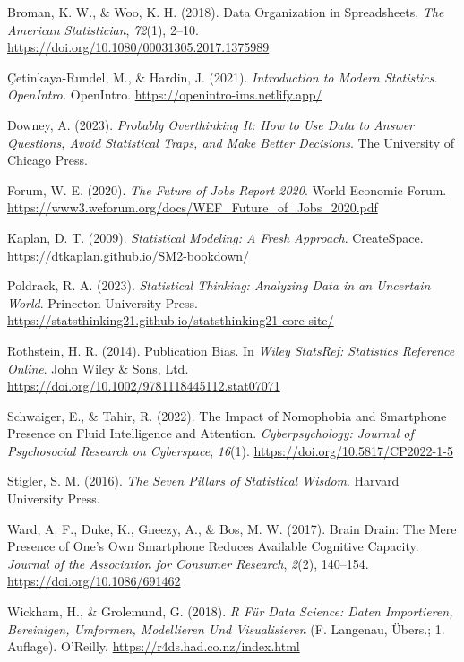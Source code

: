 \documentclass[
  a4paper,
  DIV=11]{scrreprt}
\newlength{\cslhangindent}
\newenvironment{CSLReferences}[2] %
 {\begin{list}{}{%
  \setlength{\itemindent}{0pt}
  \setlength{\leftmargin}{0pt}
  \setlength{\parsep}{0pt}
  \ifodd #1
   \setlength{\leftmargin}{\cslhangindent}
   \setlength{\itemindent}{-1\cslhangindent}
  \fi
  \setlength{\itemsep}{#2\baselineskip}}}
 {\end{list}}
\theoremstyle{definition}
\theoremstyle{definition}
\theoremstyle{definition}
\theoremstyle{remark}
\begin{document}
\label{refs}
\begin{CSLReferences}{1}{0}
Broman, K. W., \& Woo, K. H. (2018). Data Organization in Spreadsheets.
\emph{The American Statistician}, \emph{72}(1), 2--10.
\url{https://doi.org/10.1080/00031305.2017.1375989}

Çetinkaya-Rundel, M., \& Hardin, J. (2021). \emph{Introduction to Modern
Statistics. {OpenIntro}.} OpenIntro.
\url{https://openintro-ims.netlify.app/}

Downey, A. (2023). \emph{Probably Overthinking It: How to Use Data to
Answer Questions, Avoid Statistical Traps, and Make Better Decisions}.
The University of Chicago Press.

Forum, W. E. (2020). \emph{The {Future} of {Jobs Report} 2020}. World
Economic Forum.
\url{https://www3.weforum.org/docs/WEF_Future_of_Jobs_2020.pdf}

Kaplan, D. T. (2009). \emph{Statistical Modeling: A Fresh Approach}.
CreateSpace. \url{https://dtkaplan.github.io/SM2-bookdown/}

Poldrack, R. A. (2023). \emph{Statistical Thinking: Analyzing Data in an
Uncertain World}. Princeton University Press.
\url{https://statsthinking21.github.io/statsthinking21-core-site/}

Rothstein, H. R. (2014). Publication {Bias}. In \emph{Wiley {StatsRef}:
{Statistics Reference Online}}. John Wiley \& Sons, Ltd.
\url{https://doi.org/10.1002/9781118445112.stat07071}

Schwaiger, E., \& Tahir, R. (2022). The Impact of Nomophobia and
Smartphone Presence on Fluid Intelligence and Attention.
\emph{Cyberpsychology: Journal of Psychosocial Research on Cyberspace},
\emph{16}(1). \url{https://doi.org/10.5817/CP2022-1-5}

Stigler, S. M. (2016). \emph{The Seven Pillars of Statistical Wisdom}.
Harvard University Press.

Ward, A. F., Duke, K., Gneezy, A., \& Bos, M. W. (2017). Brain Drain:
{The} Mere Presence of One's Own Smartphone Reduces Available Cognitive
Capacity. \emph{Journal of the Association for Consumer Research},
\emph{2}(2), 140--154. \url{https://doi.org/10.1086/691462}

Wickham, H., \& Grolemund, G. (2018). \emph{R Für Data Science: {Daten}
Importieren, Bereinigen, Umformen, Modellieren Und Visualisieren} (F.
Langenau, Übers.; 1. Auflage). O'Reilly.
\url{https://r4ds.had.co.nz/index.html}

\end{CSLReferences}
\end{document}
